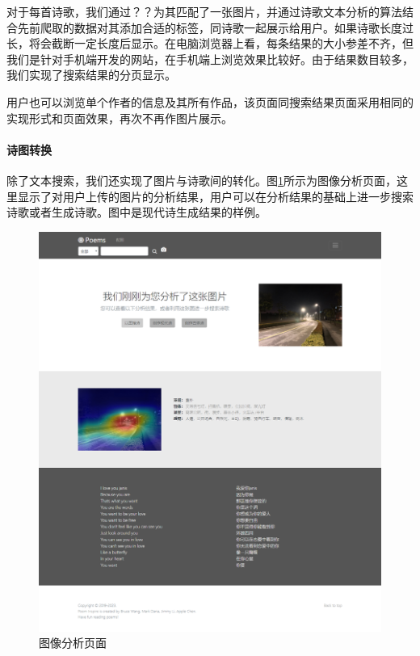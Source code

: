 \documentclass[a4paper, 10pt]{article}
\begin{document}
对于每首诗歌，我们通过？？为其匹配了一张图片，并通过诗歌文本分析的算法结合先前爬取的数据对其添加合适的标签，同诗歌一起展示给用户。如果诗歌长度过长，将会截断一定长度后显示。在电脑浏览器上看，每条结果的大小参差不齐，但我们是针对手机端开发的网站，在手机端上浏览效果比较好。由于结果数目较多，我们实现了搜索结果的分页显示。

用户也可以浏览单个作者的信息及其所有作品，该页面同搜索结果页面采用相同的实现形式和页面效果，再次不再作图片展示。


\paragraph*{诗图转换} 除了文本搜索，我们还实现了图片与诗歌间的转化。图\ref{fig:demo_analyze}所示为图像分析页面，这里显示了对用户上传的图片的分析结果，用户可以在分析结果的基础上进一步搜索诗歌或者生成诗歌。图中是现代诗生成结果的样例。

\begin{figure}[H]
\centering
\includegraphics[scale=0.48]{fig/demo_analyze.png}
\caption{图像分析页面}
\label{fig:demo_analyze}
\end{figure}
\end{document}
